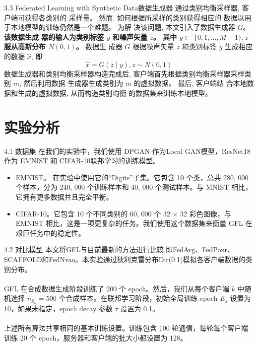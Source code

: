 \documentclass{sintefbeamer}
\theoremstyle{definition}
\begin{document}
\begin{frame}{3.3 Federated Learning with Synthetic Data}{数据生成器}
通过类别均衡采样器, 客户端可获得各类别的 采样量。 然而, 如何根据所采样的类别获得相应的 数据以用于本地模型的训练仍然是一个难题。 为解 决该问题, 本文引入了数据生成器 $G$。\textbf{该数据生成 器的输人为类别标签 $y$ 和噪声矢量 $z$。 其中 $y \in$ $\{0,1, \ldots, M-1\}, z$ 服从高斯分布 $N(0,1)$。}  数据生 成器 $G$ 根据噪声矢量 $z$ 和类别标签 $y$ 生成相应的数据 $\hat{x}$, 即
$$
\hat{x}=G(z \mid y), z \sim N(0,1) 
$$
数据生成器和类别均衡采样器构造完成后, 客户端首先根据类别均衡采样器采样类别 $m$, 然后利用数据 生成器生成类别为 $m$ 的虚拟数据。 最后, 客户端结 合本地数据和生成的虚拟数据, 从而构造类别均衡 的数据集来训练本地模型。
\end{frame}





\section{实验分析}

\begin{frame}{4.1 数据集}
在我们的实验中，我们使用 DPGAN 作为Local GAN模型，ResNet18 作为 EMNIST 和 CIFAR-10联邦学习的训练模型。

	\begin{itemize}
\item[1)] EMNIST。 在实验中使用它的“Digits”子集。它包含 10 个类，总共 280, 000 个样本，分为 240, 000 个训练样本和 40, 000 个测试样本。与 MNIST 相比，它拥有更多数据并且完全平衡。
\item[2)] CIFAR-10。它包含 10 个不同类别的 60, 000 个 32 × 32 彩色图像，与 EMNIST 相比，这是一项更复杂的任务。我们使用这个数据集来衡量 GFL 在艰巨任务中的稳定性。
\end{itemize}
\end{frame}

\begin{frame}{4.2 对比模型}
本文将GFL与目前最新的方法进行比较,即FedAvg、FedPoxr、SCAFFOLD和FedNvao。本实验通过狄利克雷分布Dir(0.1)模拟各客户端数据的类别分布。
	\\ \hspace*{\fill} \\
GFL 在合成数据生成阶段训练了 200 个 epoch。然后，我们从每个客户端 $k$ 中随机选择 $n_{S_k}=500$  个合成样本。在联邦学习阶段，初始全局训练 epoch $E_s$ 设置为 10，如果未指定，epoch decay 参数 $\tau$ 设置为 0.1。
	\\ \hspace*{\fill} \\
上述所有算法共享相同的基本训练设置。训练包含 100 轮通信，每轮每个客户端训练 20 个 epoch，服务器和客户端的批大小都设置为 128。
\end{frame}
\end{document}
